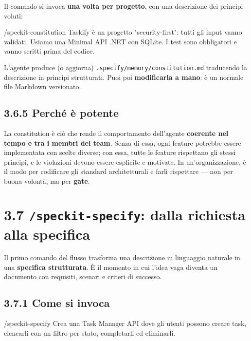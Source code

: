 \documentclass[
  italian,
  10pt,
]{book}
\newenvironment{Shaded}{\begin{snugshade}}{\end{snugshade}}
\newcommand{\NormalTok}[1]{#1}
\begin{document}
Il comando si invoca \textbf{una volta per progetto}, con una
descrizione dei principi voluti:

\begin{Shaded}
\begin{Highlighting}[]
\NormalTok{/speckit{-}constitution Taskify è un progetto "security{-}first": tutti gli input}
\NormalTok{vanno validati. Usiamo una Minimal API .NET con SQLite. I test sono obbligatori}
\NormalTok{e vanno scritti prima del codice.}
\end{Highlighting}
\end{Shaded}

L'agente produce (o aggiorna) \texttt{.specify/memory/constitution.md}
traducendo la descrizione in principi strutturati. Puoi poi
\textbf{modificarla a mano}: è un normale file Markdown versionato.

\subsection{3.6.5 Perché è potente}\label{perchuxe9-uxe8-potente}

La constitution è ciò che rende il comportamento dell'agente
\textbf{coerente nel tempo e tra i membri del team}. Senza di essa, ogni
feature potrebbe essere implementata con scelte diverse; con essa, tutte
le feature rispettano gli stessi principi, e le violazioni devono essere
esplicite e motivate. In un'organizzazione, è il modo per codificare gli
standard architetturali e farli rispettare --- non per buona volontà, ma
per \textbf{gate}.

\section{\texorpdfstring{3.7 \texttt{/speckit-specify}: dalla richiesta
alla
specifica}{3.7 /speckit-specify: dalla richiesta alla specifica}}\label{speckit-specify-dalla-richiesta-alla-specifica}

Il primo comando del flusso trasforma una descrizione in linguaggio
naturale in una \textbf{specifica strutturata}. È il momento in cui
l'idea vaga diventa un documento con requisiti, scenari e criteri di
successo.

\subsection{3.7.1 Come si invoca}\label{come-si-invoca}

\begin{Shaded}
\begin{Highlighting}[]
\NormalTok{/speckit{-}specify Crea una Task Manager API dove gli utenti possono creare task,}
\NormalTok{elencarli con un filtro per stato, completarli ed eliminarli.}
\end{Highlighting}
\end{Shaded}
\end{document}
